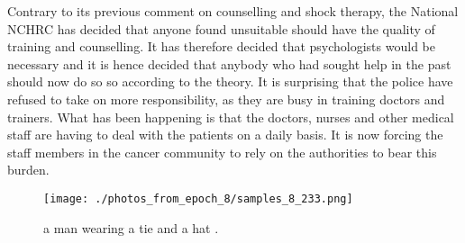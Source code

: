 \documentclass{article}%
\begin{document}
Contrary to its previous comment on counselling and shock therapy, the National NCHRC has decided that anyone found unsuitable should have the quality of training and counselling. It has therefore decided that psychologists would be necessary and it is hence decided that anybody who had sought help in the past should now do so so according to the theory. It is surprising that the police have refused to take on more responsibility, as they are busy in training doctors and trainers.\newline%
What has been happening is that the doctors, nurses and other medical staff are having to deal with the patients on a daily basis. It is now forcing the staff members in the cancer community to rely on the authorities to bear this burden.\newline%

%


\begin{figure}[h!]%
\centering%
\texttt{[image: ./photos\_from\_epoch\_8/samples\_8\_233.png]}%
\caption{a man wearing a tie and a hat .}%
\end{figure}

%
\end{document}

